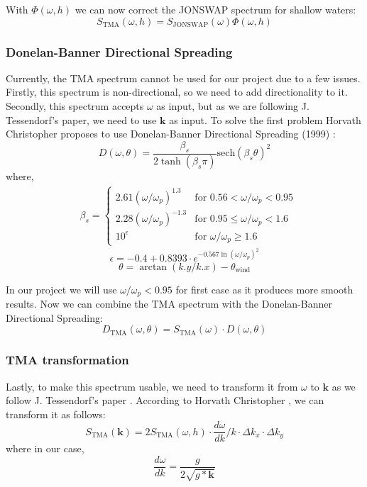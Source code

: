 With $\Phi(\omega, h)$ we can now correct the JONSWAP spectrum for shallow waters:
\begin{equation}
    S_{\text{TMA}}(\omega, h) = S_{\text{JONSWAP}}(\omega) \Phi(\omega, h)
    \label{eq:tma_spectrum}
\end{equation}

\subsubsection{Donelan-Banner Directional Spreading}
Currently, the TMA spectrum cannot be used for our project due to a few issues. Firstly, this spectrum is non-directional, so we need to add directionality to it. Secondly, this spectrum accepts $\omega$ as input, but as we are following J. Tessendorf's \cite{tessendorf2001} paper, we need to use $\mathbf{k}$ as input.
To solve the first problem Horvath Christopher \cite{horvath2015} proposes to use Donelan-Banner Directional Spreading (1999) \cite{young1999}:
\begin{equation}
    D(\omega, \theta) = \frac{\beta_s}{2 \tanh(\beta_s\pi)}\text{sech}(\beta_s\theta)^{2}
\end{equation}
where,
$$
\begin{aligned}
    &\beta_s =
    \begin{cases} 
    2.61(\omega/\omega_p)^{1.3} & \text{for } 0.56 < \omega/\omega_p < 0.95 \\
    2.28(\omega/\omega_p)^{-1.3} & \text{for } 0.95 \leq \omega/\omega_p < 1.6 \\
    10^{\epsilon} & \text{for } \omega/\omega_p \geq 1.6
    \end{cases}
\end{aligned}
$$
$$
\epsilon = -0.4 + 0.8393 \cdot e^{-0.567\ln(\omega/\omega_p)^{2}}
$$
$$
\theta = \arctan(k.y / k.x) - \theta_{\text{wind}}
$$

In our project we will use $\omega/\omega_p < 0.95$ for first case as it produces more smooth results.
Now we can combine the TMA spectrum with the Donelan-Banner Directional Spreading:
\begin{equation}
    D_{\text{TMA}}(\omega, \theta) = S_{\text{TMA}}(\omega) \cdot D(\omega, \theta)
\end{equation}

\subsubsection{TMA transformation}
Lastly, to make this spectrum usable, we need to transform it from $\omega$ to $\mathbf{k}$ as we follow J. Tessendorf's paper \cite{tessendorf2001}. According to Horvath Christopher \cite{horvath2015}, we can transform it as follows:
\begin{equation}
    S_{\text{TMA}}(\mathbf{k}) = 2S_{\text{TMA}}(\omega, h) \cdot \frac{d\omega}{dk} / k \cdot \Delta k_x \cdot \Delta k_y
    \label{eq:tma_spectrum_k}
\end{equation}
where in our case,
$$
\frac{d\omega}{dk} = \frac{g}{2\sqrt{g*\mathbf{k}}}
$$

